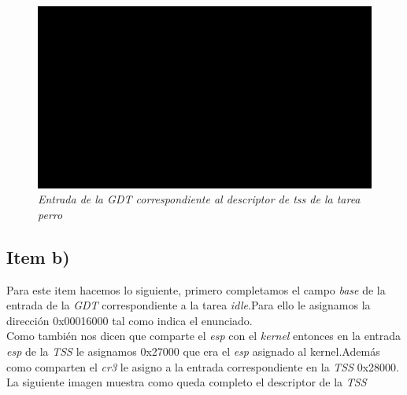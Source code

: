 \begin{figure}[H]
\begin{center}
\includegraphics[width=\linewidth]{ejercicio6/gdt_perro.png}
\caption{{\small \textit{Entrada de la \textit{GDT} correspondiente al descriptor de tss de la tarea perro }}}
\endminipage
\end{center}
\end{figure}


\subsection{Item b)}
Para este item hacemos lo siguiente, primero completamos el campo \textit{base} de la entrada de la \textit{GDT} correspondiente a la tarea \textit{idle}.Para ello le asignamos la dirección 0x00016000 tal como indica el enunciado.\\
Como también nos dicen que comparte el \textit{esp} con el \textit{kernel} entonces en la entrada \textit{esp} de la \textit{TSS} le asignamos 0x27000 que era el \textit{esp} asignado al kernel.Además como comparten el \textit{cr3} le asigno a la entrada correspondiente en la \textit{TSS} 0x28000.\\%
La siguiente imagen muestra como queda completo el descriptor de la \textit{TSS}\\

